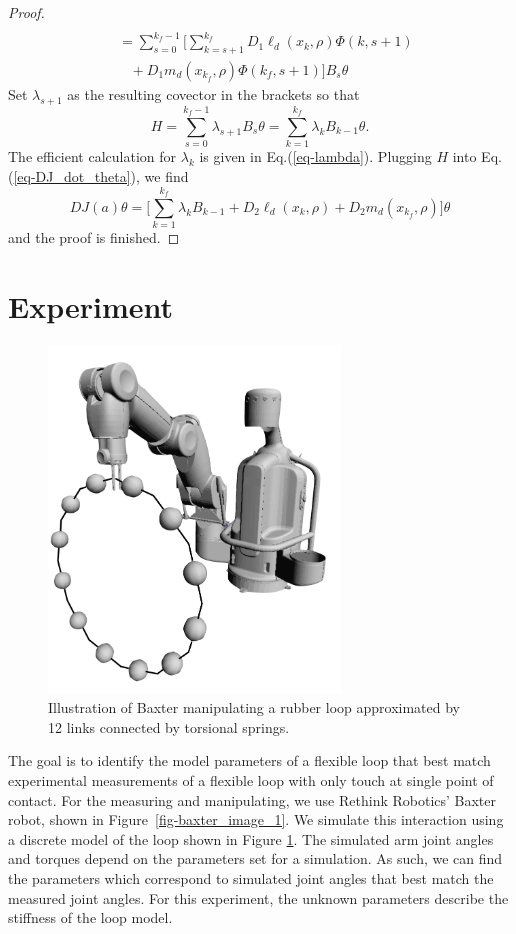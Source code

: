 \documentclass[letterpaper, 10pt, conference]{ieeeconf}
\begin{document}
\begin{proof}
\[\begin{array}{l}
\\\hspace{10pt} = \sum_{s=0}^{k_f-1}\Big[\sum_{k = s+1}^{k_f}D_1\ell_d(x_k,\rho) \Phi(k,s+1) \\\hspace{20pt}+ D_1m_d(x_{k_f},\rho)\Phi(k_f,s+1)\Big]B_s\theta
\end{array}
\]
Set $\lambda_{s+1}$ as the resulting covector in the brackets so that 
\[
H = \sum_{s=0}^{k_f-1} \lambda_{s+1} B_s\theta = \sum_{k=1}^{k_f} \lambda_{k} B_{k-1}\theta.
\]
The efficient calculation for $\lambda_k$ is given in Eq.(\ref{eq-lambda}).  Plugging $H$ into Eq.(\ref{eq-DJ_dot_theta}), we find
\[
DJ(a)\theta = \Big[\sum_{k = 1}^{k_f}\lambda_kB_{k-1} +D_2\ell_d(x_k,\rho) + D_2m_d(x_{k_f},\rho)\Big]\theta
\]
and the proof is finished.
\end{proof}

\section{Experiment}
\label{sec-experiment}
\begin{figure}[!htb]
\centering
\includegraphics[width = 220pt]{init_bloop}
\caption{Illustration of Baxter manipulating a rubber loop approximated by 12 links connected by torsional springs.}
\label{fig-bloop_experiment}
\end{figure}

The goal is to identify the model parameters of a flexible loop that best match experimental measurements of a flexible loop with only touch at single point of contact.  For the measuring and manipulating, we use Rethink Robotics' Baxter robot, shown in Figure~\ref{fig-baxter_image_1}. We simulate this interaction using a discrete model of the loop shown in Figure \ref{fig-bloop_experiment}. The simulated arm joint angles and torques depend on the parameters set for a simulation.  As such, we can find the parameters which correspond to simulated joint angles that best match the measured joint angles.  For this experiment, the unknown parameters describe the stiffness of the loop model.
\end{document}
